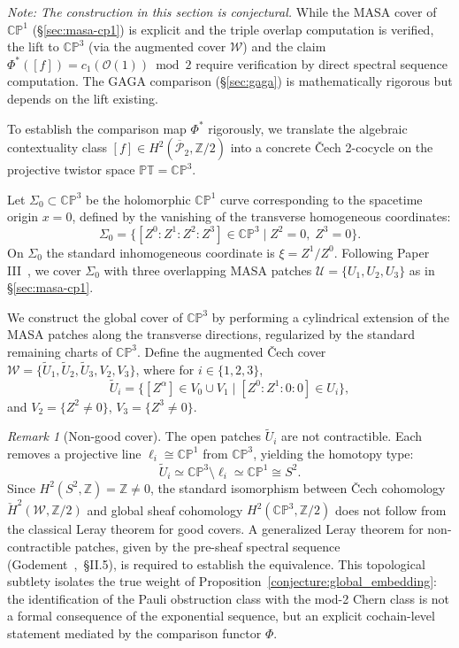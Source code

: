\documentclass[11pt,a4paper]{article}
\theoremstyle{remark}
\newtheorem{remark}[theorem]{Remark}
\newcommand{\PT}{\mathbb{PT}}
\newcommand{\CP}{\mathbb{CP}}
\newcommand{\Z}{\mathbb{Z}}
\newcommand{\cO}{\mathcal{O}}
\newcommand{\barPP}{\overline{\mathcal{P}}}
\begin{document}
{\small\emph{Note: The construction in this section is conjectural.}
While the MASA cover of $\CP^1$ (\S\ref{sec:masa-cp1}) is explicit
and the triple overlap computation is verified, the lift to $\CP^3$
(via the augmented cover $\mathcal{W}$) and the claim
$\Phi^*([f]) = c_1(\cO(1)) \bmod 2$ require verification by direct
spectral sequence computation. The GAGA comparison (\S\ref{sec:gaga})
is mathematically rigorous but depends on the lift existing.}

To establish the comparison map $\Phi^*$ rigorously, we translate
the algebraic contextuality class $[f] \in H^2(\barPP_2, \Z/2)$
into a concrete \v{C}ech 2-cocycle on the projective twistor space
$\PT = \CP^3$.

Let $\Sigma_0 \subset \CP^3$ be the holomorphic $\CP^1$ curve
corresponding to the spacetime origin $x = 0$, defined by the
vanishing of the transverse homogeneous coordinates:
\begin{equation}
  \Sigma_0 = \bigl\{ [Z^0 : Z^1 : Z^2 : Z^3] \in \CP^3
    \;\big|\; Z^2 = 0,\; Z^3 = 0 \bigr\}.
\end{equation}
On $\Sigma_0$ the standard inhomogeneous coordinate is
$\xi = Z^1/Z^0$. Following Paper III~\cite{PaperIII}, we cover $\Sigma_0$ with
three overlapping MASA patches
$\mathcal{U} = \{U_1, U_2, U_3\}$ as in \S\ref{sec:masa-cp1}.

We construct the global cover of $\CP^3$ by performing a cylindrical
extension of the MASA patches along the transverse directions,
regularized by the standard remaining charts of $\CP^3$.
Define the augmented \v{C}ech cover
$\mathcal{W} = \{\tilde{U}_1, \tilde{U}_2, \tilde{U}_3, V_2, V_3\}$,
where for $i \in \{1,2,3\}$,
\begin{equation}
  \tilde{U}_i = \bigl\{ [Z^\alpha] \in V_0 \cup V_1
    \;\big|\; [Z^0:Z^1:0:0] \in U_i \bigr\},
\end{equation}
and $V_2 = \{Z^2 \neq 0\}$, $V_3 = \{Z^3 \neq 0\}$.

\begin{remark}[Non-good cover]
\label{rem:non-good}
The open patches $\tilde{U}_i$ are not contractible. Each removes a
projective line $\ell_i \cong \CP^1$ from $\CP^3$, yielding the
homotopy type:
\[
\tilde{U}_i \simeq \CP^3 \setminus \ell_i \simeq \CP^1 \cong S^2.
\]
Since $H^2(S^2, \Z) = \Z \neq 0$, the standard isomorphism between
\v{C}ech cohomology $\check{H}^2(\mathcal{W}, \Z/2)$ and global
sheaf cohomology $H^2(\CP^3, \Z/2)$ does not follow from the
classical Leray theorem for good covers. A generalized Leray theorem
for non-contractible patches, given by the pre-sheaf spectral
sequence (Godement~\cite{Godement1958},~\S II.5), is required
to establish the equivalence.
This topological subtlety isolates the true weight of
Proposition~\ref{conjecture:global_embedding}: the identification of
the Pauli obstruction class with the mod-2 Chern class is not a
formal consequence of the exponential sequence, but an explicit
cochain-level statement mediated by the comparison functor $\Phi$.
\end{remark}
\end{document}
